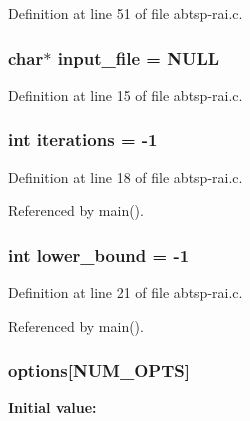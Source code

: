 Definition at line 51 of file abtsp-rai.c.\hypertarget{abtsp-rai_8c_a4f3a15de34c409bdec6ceacf93078ed}{
\subsubsection{\setlength{\rightskip}{0pt plus 5cm}char$\ast$ {\bf input\_\-file} = NULL}}
\label{abtsp-rai_8c_a4f3a15de34c409bdec6ceacf93078ed}




Definition at line 15 of file abtsp-rai.c.\hypertarget{abtsp-rai_8c_1d10e252e778731e59f0f71afd7e727e}{
\subsubsection{\setlength{\rightskip}{0pt plus 5cm}int {\bf iterations} = -1}}
\label{abtsp-rai_8c_1d10e252e778731e59f0f71afd7e727e}




Definition at line 18 of file abtsp-rai.c.

Referenced by main().\hypertarget{abtsp-rai_8c_ed7394fd8e0c2796b26b9654fd10fd9d}{
\subsubsection{\setlength{\rightskip}{0pt plus 5cm}int {\bf lower\_\-bound} = -1}}
\label{abtsp-rai_8c_ed7394fd8e0c2796b26b9654fd10fd9d}




Definition at line 21 of file abtsp-rai.c.

Referenced by main().\hypertarget{abtsp-rai_8c_cea6a9709d519c143f30db401a0d0c72}{
\subsubsection{ {\bf options}\mbox{[}NUM\_\-OPTS\mbox{]}}}
\label{abtsp-rai_8c_cea6a9709d519c143f30db401a0d0c72}


\textbf{Initial value:}

